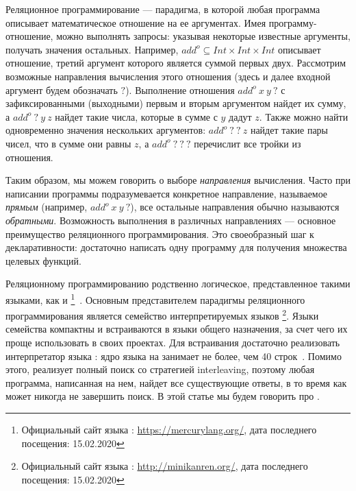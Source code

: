 \documentclass[conference,american,russian]{IEEEtran}
\begin{document}
Реляционное программирование --- парадигма, в которой любая программа описывает математическое отношение на ее аргументах. 
Имея программу-отношение, можно выполнять запросы: указывая некоторые известные аргументы, получать значения остальных.
Например, $add^o \subseteq Int \times Int \times Int$ описывает отношение, третий аргумент которого является суммой первых двух. 
Рассмотрим возможные направления вычисления этого отношения (здесь и далее входной аргумент будем обозначать $?$).
Выполнение отношения $add^o  \ x \ y \ ?$ с зафиксированными (выходными) первым и вторым аргументом найдет их сумму, а $add^o \ ? \ y \ z$ найдет такие числа, которые в сумме с $y$ дадут $z$. 
Также можно найти одновременно значения нескольких аргументов: $add^o \ ? \ ? \ z$ найдет такие пары чисел, что в сумме они равны $z$, а $add^o \ ? \ ? \ ?$ перечислит все тройки из отношения. 

Таким образом, мы можем говорить о выборе \textit{направления} вычисления. 
Часто при написании программы подразумевается конкретное направление, называемое \textit{прямым} (например, $add^o  \ x \ y \ ?$), все остальные направления обычно называются \textit{обратными}. 
Возможность выполнения в различных направлениях --- основное преимущество реляционного программирования. 
Это своеобразный шаг к декларативности: достаточно написать одну программу для получения множества целевых функций. 

Реляционному программированию родственно логическое, представленное такими языками, как \prolog{} и \mercury{}\footnote{Официальный сайт языка \mercury{}: \url{https://mercurylang.org/}, дата последнего посещения: 15.02.2020}~\cite{SOMOGYI199617}.
Основным представителем парадигмы реляционного программирования является семейство интерпретируемых языков \miniKanren{}\footnote{Официальный сайт языка \miniKanren{}: \url{http://minikanren.org/}, дата последнего посещения: 15.02.2020}.
Языки семейства \miniKanren{} компактны и встраиваются в языки общего назначения, за счет чего их проще использовать в своих проектах. 
Для встраивания достаточно реализовать интерпретатор языка \miniKanren{}: ядро языка на \scheme{} занимает не более, чем 40 строк~\cite{hemann2013ukanren}.
Помимо этого, \miniKanren{} реализует полный поиск со стратегией interleaving, поэтому любая программа, написанная на нем, найдет все существующие ответы, в то время как \prolog{} может никогда не завершить поиск. 
В этой статье мы будем говорить про \miniKanren{}.
\end{document}
